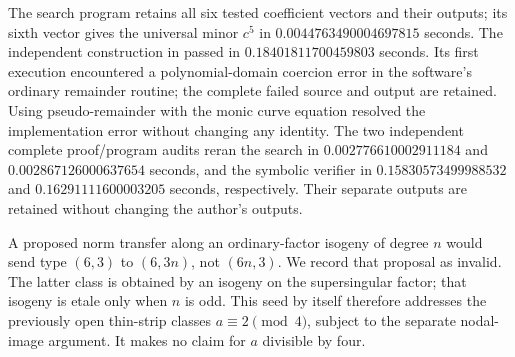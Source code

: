 \begin{remark}
\label{rem:root-mixed-six-three-certificate}
The search program  retains
all six tested coefficient vectors and their outputs; its sixth
vector gives the universal minor $c^5$ in
$0.0044763490004697815$ seconds.
The independent construction in
 passed in
$0.18401811700459803$ seconds. Its first execution encountered a
polynomial-domain coercion error in the software's ordinary
remainder routine; the complete failed source and output are
retained. Using pseudo-remainder with the monic curve equation
resolved the implementation error without changing any identity.
The two independent complete proof/program audits reran the search
in $0.002776610002911184$ and $0.002867126000637654$ seconds,
and the symbolic verifier in $0.15830573499988532$ and
$0.16291111600003205$ seconds, respectively. Their separate
outputs are retained without changing the author's outputs.

A proposed norm transfer along an ordinary-factor isogeny of
degree $n$ would send type $(6,3)$ to $(6,3n)$, not $(6n,3)$.
We record that proposal as invalid. The latter class is obtained
by an isogeny on the supersingular factor; that isogeny is etale
only when $n$ is odd. This seed by itself therefore addresses
the previously open thin-strip classes $a\equiv2\pmod4$,
subject to the separate nodal-image argument. It makes no claim
for $a$ divisible by four.
\end{remark}
